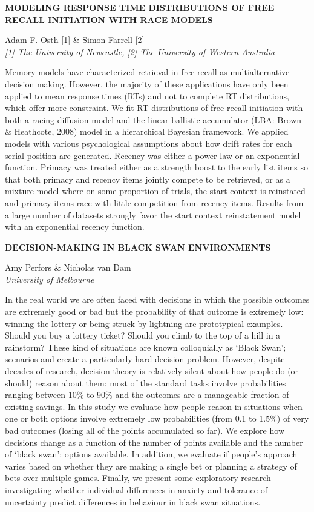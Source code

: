\documentclass[]{article}
\begin{document}
\textbf{MODELING RESPONSE TIME DISTRIBUTIONS OF FREE RECALL INITIATION
WITH RACE MODELS}

Adam F. Osth {[}1{]} \& Simon Farrell {[}2{]}\\
\emph{{[}1{]} The University of Newcastle, {[}2{]} The University of
Western Australia}

Memory models have characterized retrieval in free recall as
multialternative decision making. However, the majority of these
applications have only been applied to mean response times (RTs) and not
to complete RT distributions, which offer more constraint. We fit RT
distributions of free recall initiation with both a racing diffusion
model and the linear ballistic accumulator (LBA: Brown \& Heathcote,
2008) model in a hierarchical Bayesian framework. We applied models with
various psychological assumptions about how drift rates for each serial
position are generated. Recency was either a power law or an exponential
function. Primacy was treated either as a strength boost to the early
list items so that both primacy and recency items jointly compete to be
retrieved, or as a mixture model where on some proportion of trials, the
start context is reinstated and primacy items race with little
competition from recency items. Results from a large number of datasets
strongly favor the start context reinstatement model with an exponential
recency function.\\
\pagebreak  

\textbf{DECISION-MAKING IN BLACK SWAN ENVIRONMENTS}

Amy Perfors \& Nicholas van Dam\\
\emph{University of Melbourne}

In the real world we are often faced with decisions in which the
possible outcomes are extremely good or bad but the probability of that
outcome is extremely low: winning the lottery or being struck by
lightning are prototypical examples. Should you buy a lottery ticket?
Should you climb to the top of a hill in a rainstorm? These kind of
situations are known colloquially as `Black Swan'; scenarios and create
a particularly hard decision problem. However, despite decades of
research, decision theory is relatively silent about how people do (or
should) reason about them: most of the standard tasks involve
probabilities ranging between 10\% to 90\% and the outcomes are a
manageable fraction of existing savings. In this study we evaluate how
people reason in situations when one or both options involve extremely
low probabilities (from 0.1 to 1.5\%) of very bad outcomes (losing all
of the points accumulated so far). We explore how decisions change as a
function of the number of points available and the number of `black
swan'; options available. In addition, we evaluate if people's approach
varies based on whether they are making a single bet or planning a
strategy of bets over multiple games. Finally, we present some
exploratory research investigating whether individual differences in
anxiety and tolerance of uncertainty predict differences in behaviour in
black swan situations.\\
\pagebreak  
\end{document}
